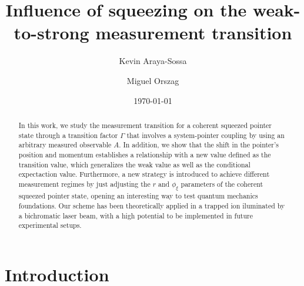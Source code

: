 \documentclass[aps,pra,preprint,superscriptaddress, showpacs]{revtex4-2}
\begin{document}
\title{Influence of squeezing on the weak-to-strong measurement transition}

\author{Kevin Araya-Sossa}
\author{Miguel Orszag}

\date{\today}

\begin{abstract}

In this work, we study the measurement transition for a coherent squeezed pointer state through a transition factor $\Gamma$ that involves a system-pointer coupling by using an arbitrary measured observable $A$. In addition, we show that the shift in the pointer's position and momentum establishes a relationship with a new value defined as the transition value, which generalizes the weak value as well as the conditional expectaction value. Furthermore, a new strategy is introduced to achieve different measurement regimes by just adjusting the $r$ and $\phi_{\xi}$ parameters of the coherent squeezed pointer state, opening an interesting way to test quantum mechanics foundations. Our scheme has been theoretically applied in a trapped ion iluminated by a bichromatic laser beam, with a high potential to be implemented in future experimental setups.


\end{abstract}


\maketitle

\section{\label{sec:intro}Introduction}
\end{document}

